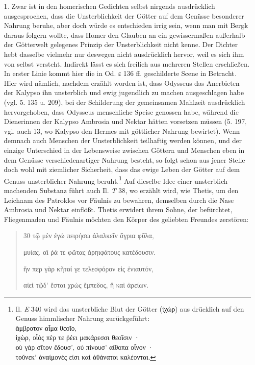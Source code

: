 \documentclass[a4paper, 11pt, oneside]{article}
\begin{document}
1. Zwar ist in den homerischen Gedichten selbst nirgends ausdrücklich ausgesprochen, dass die Unsterblichkeit der Götter auf dem Genüsse besonderer Nahrung beruhe, aber doch würde es entschieden irrig sein, wenn man mit Bergk daraus folgern wollte, dass Homer den Glauben an ein gewissermaßen außerhalb der Götterwelt gelegenes Prinzip der Unsterblichkeit nicht kenne. Der Dichter hebt dasselbe vielmehr nur deswegen nicht ausdrücklich hervor, weil es sich ihm von selbst versteht. Indirekt lässt es sich freilich aus mehreren Stellen erschließen. In erster Linie kommt hier die in Od. ε 136 ff. geschilderte Scene in Betracht. Hier wird nämlich, nachdem erzählt worden ist, dass Odysseus das Anerbieten der Kalypso ihn unsterblich und ewig jugendlich zu machen ausgeschlagen habe (vgl. 5. 135 u. 209), bei der Schilderung der gemeinsamen Mahlzeit ausdrücklich hervorgehoben, dass Odysseus menschliche Speise genossen habe, während die Dienerinnen der Kalypso Ambrosia und Nektar hätten vorsetzen müssen (5. 197, vgl. auch 13, wo Kalypso den Hermes mit göttlicher Nahrung bewirtet). Wenn demnach auch Menschen der Unsterblichkeit teilhaftig werden können, und der einzige Unterschied in der Lebensweise zwischen Göttern und Menschen eben in dem Genüsse verschiedenartiger Nahrung besteht, so folgt schon aus jener Stelle doch wohl mit ziemlicher Sicherheit, dass das ewige Leben der Götter auf dem Genuss unsterblicher Nahrung beruht.\footnote{Il. \emph{E} 340 wird das unsterbliche Blut der Götter (ἰχώρ) aus drücklich auf den Genuss himmlischer Nahrung zurückgeführt:\\\hspace*{15mm}ἄμβροτον αἷμα θεοῖο,\\\hspace*{5mm}ἰχὼρ, οἷός πὲρ τε ῥέει μακάρεσσι θεοῖσιν ·\\\hspace*{5mm}οὐ γὰρ σῖτον ἔδουσ', οὐ πίνουσ' αἴθοπα οἷνον ·\\\hspace*{5mm}τοὔνεκ' ἀναίμονές εἰσι καὶ ἀθάνατοι καλέονται.} Auf dieselbe Idee einer unsterblich machenden Substanz führt auch Il. \emph{T} 38, wo erzählt wird, wie Thetis, um den Leichnam des Patroklos vor Fäulnis zu bewahren, demselben durch die Nase Ambrosia und Nektar einflößt. Thetis erwidert ihrem Sohne, der befürchtet, Fliegenmaden und Fäulnis möchten den Körper des geliebten Freundes zerstören:
\begin{quotation}
30 τῷ μὲν ἐγὼ πειρήσω ἀλαλκεῖν ἄγρια φῦλα,

μυίας, αἵ ῥά τε φῶτας ἀρηιφάτους κατέδουσιν.

ἤν περ γὰρ κῆταί γε τελεσφόρον εἰς ἐνιαυτόν,

αἰεὶ τῷδ' ἔσται χρὼς ἔμπεδος, ἢ καὶ ἀρείων.
\end{quotation}
\end{document}
